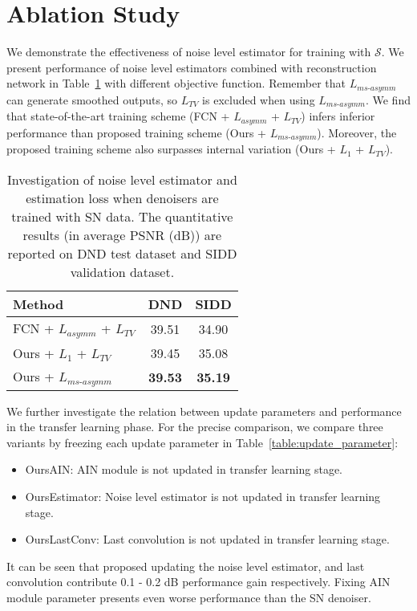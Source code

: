 \documentclass[10pt,twocolumn,letterpaper]{article}
\begin{document}
\section{Ablation Study}
We demonstrate the effectiveness of noise level estimator for training with $\mathcal{S}$.
We present performance of noise level estimators combined with reconstruction network in Table~\ref{table:combined_estimator} with different objective function.
Remember that $L_{ms\text{-}asymm}$ can generate smoothed outputs, so $L_{TV}$ is excluded when using $L_{ms\text{-}asymm}$.
We find that state-of-the-art training scheme (FCN + $L_{asymm}$ + $L_{TV}$) infers inferior performance than proposed training scheme (Ours + $L_{ms\text{-}asymm}$).  
Moreover, the proposed training scheme also surpasses internal variation (Ours + $L_{1}$ + $L_{TV}$). 

\begin{table}[h]
	\centering
	\caption{Investigation of noise level estimator and estimation loss when denoisers are trained with SN data. The quantitative results (in average PSNR (dB)) are reported on DND test dataset and SIDD validation dataset.}
	\label{table:combined_estimator}
	\begin{adjustbox}{width=0.6\linewidth}
		\begin{tabular}{lcc}
			\toprule
			Method   & DND & SIDD \\
			\midrule
			FCN + $L_{asymm}$ + $L_{TV}$    & 39.51 & 34.90 \\		
			Ours + $L_{1}$ + $L_{TV}$    & 39.45 & 35.08 \\
			Ours + $L_{ms\text{-}asymm}$ & \textbf{39.53} & \textbf{35.19} \\ 		
			\bottomrule			
		\end{tabular}
	\end{adjustbox}
\end{table}

We further investigate the relation between update parameters and performance in the transfer learning phase.
For the precise comparison, we compare three variants by freezing each update parameter in Table~\ref{table:update_parameter}:
\begin{itemize}
	\item Ours\text{-}AIN: AIN module is not updated in transfer learning stage.	
	\item Ours\text{-}Estimator: Noise level estimator is not updated in transfer learning stage.
	\item Ours\text{-}LastConv: Last convolution is not updated in transfer learning stage.	
\end{itemize}
It can be seen that proposed updating the noise level estimator, and last convolution contribute 0.1 - 0.2 dB performance gain respectively. Fixing AIN module parameter presents even worse performance than the SN denoiser.
\end{document}
